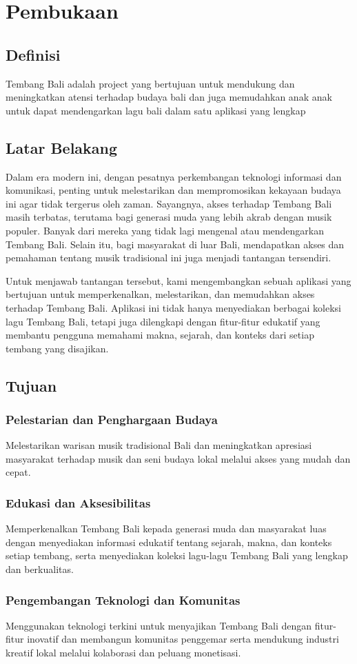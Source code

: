 \section{Pembukaan}

\subsection{Definisi}
Tembang Bali adalah project yang bertujuan untuk mendukung dan meningkatkan atensi terhadap budaya bali dan juga memudahkan 
anak anak untuk dapat mendengarkan lagu bali dalam satu aplikasi yang lengkap

\subsection{Latar Belakang}
Dalam era modern ini, dengan pesatnya perkembangan teknologi informasi dan komunikasi, penting untuk melestarikan dan mempromosikan 
kekayaan budaya ini agar tidak tergerus oleh zaman. Sayangnya, akses terhadap Tembang Bali masih terbatas, terutama bagi generasi muda 
yang lebih akrab dengan musik populer. Banyak dari mereka yang tidak lagi mengenal atau mendengarkan Tembang Bali. 
Selain itu, bagi masyarakat di luar Bali, mendapatkan akses dan pemahaman tentang musik tradisional ini juga menjadi tantangan tersendiri.

Untuk menjawab tantangan tersebut, kami mengembangkan sebuah aplikasi yang bertujuan untuk memperkenalkan, melestarikan, dan 
memudahkan akses terhadap Tembang Bali. Aplikasi ini tidak hanya menyediakan berbagai koleksi lagu Tembang Bali, tetapi juga dilengkapi 
dengan fitur-fitur edukatif yang membantu pengguna memahami makna, sejarah, dan konteks dari setiap tembang yang disajikan.

\subsection{Tujuan}
\subsubsection{Pelestarian dan Penghargaan Budaya}
Melestarikan warisan musik tradisional Bali dan meningkatkan apresiasi masyarakat terhadap musik dan seni budaya lokal melalui akses yang mudah dan cepat.

\subsubsection{Edukasi dan Aksesibilitas}
Memperkenalkan Tembang Bali kepada generasi muda dan masyarakat luas dengan menyediakan informasi edukatif tentang sejarah, makna, dan konteks setiap tembang, serta menyediakan koleksi lagu-lagu Tembang Bali yang lengkap dan berkualitas.


\subsubsection{Pengembangan Teknologi dan Komunitas}
Menggunakan teknologi terkini untuk menyajikan Tembang Bali dengan fitur-fitur inovatif dan membangun komunitas penggemar serta mendukung industri kreatif lokal melalui kolaborasi dan peluang monetisasi.